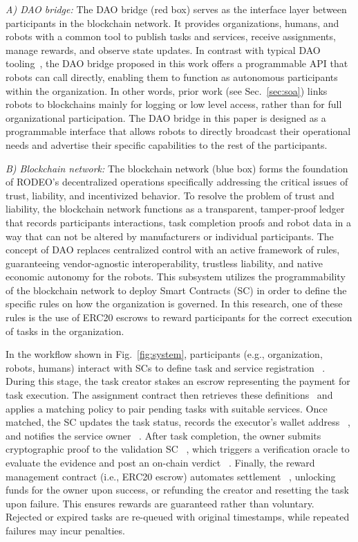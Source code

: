 \documentclass[letterpaper, 10 pt, conference]{ieeeconf}  %
\newcommand*\circled[2][2pt]{%
  \tikz[baseline=(char.base)]{%
    \node[draw,circle,inner sep=#1] (char) {\strut #2};}}
\begin{document}
\noindent \textit{A) DAO bridge:}
The DAO bridge (red box) serves as the interface layer between participants in the blockchain network. It provides organizations, humans, and robots with a common tool to publish tasks and services, receive assignments, manage rewards, and observe state updates. In contrast with typical DAO tooling~\cite{Lustenbergeretal2025}, the DAO bridge proposed in this work offers a programmable API that robots can call directly, enabling them to function as autonomous participants within the organization. In other words, prior work (see Sec.~\ref{sec:soa}) links robots to blockchains mainly for logging or low level access, rather than for full organizational participation. The DAO bridge in this paper is designed as a programmable interface that allows robots to directly broadcast their operational needs and advertise their specific capabilities to the rest of the participants.

\noindent \textit{B) Blockchain network:}
The blockchain network (blue box) forms the foundation of RODEO's decentralized operations specifically addressing the critical issues of trust, liability, and incentivized behavior. To resolve the problem of trust and liability, the blockchain network functions as a transparent, tamper-proof ledger that records participants interactions, task completion proofs and robot data in a way that can not be altered by manufacturers or individual participants. The concept of DAO replaces centralized control with an active framework of rules, guaranteeing vendor-agnostic interoperability, trustless liability, and native economic autonomy for the robots. This subsystem utilizes the programmability of the blockchain network to deploy Smart Contracts (SC) in order to define the specific rules on how the organization is governed. In this research, one of these rules is the use of ERC20 escrows to reward participants for the correct execution of tasks in the organization. 

In the workflow shown in Fig.~\ref{fig:system}, participants (e.g., organization, robots, humans) interact with SCs to define task and service registration~\circled[0.1pt]{1}. During this stage, the task creator stakes an escrow representing the payment for task execution. The assignment contract then retrieves these definitions~\circled[0.1pt]{2} and applies a matching policy to pair pending tasks with suitable services. Once matched, the SC updates the task status, records the executor’s wallet address~\circled[0.1pt]{3}, and notifies the service owner~\circled[0.1pt]{4}. After task completion, the owner submits cryptographic proof to the validation SC~\circled[0.1pt]{5}, which triggers a verification oracle to evaluate the evidence and post an on-chain verdict~\circled[0.1pt]{6}. Finally, the reward management contract (i.e., ERC20 escrow) automates settlement~\circled[0.1pt]{7}, unlocking funds for the owner upon success, or refunding the creator and resetting the task upon failure. This ensures rewards are guaranteed rather than voluntary. Rejected or expired tasks are re-queued with original timestamps, while repeated failures may incur penalties.
\end{document}
